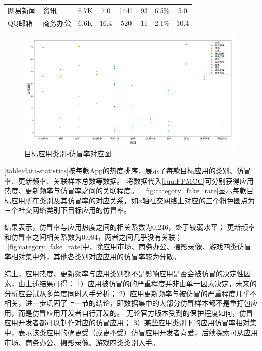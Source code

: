 \begin{ThreePartTable}
\begin{longtable}{l l c c c c c c}
        \rowcolor{gray!15} 网易新闻     & 资讯       & 6.7K                       & 7.0                        & 1441           & 93                         & 6.5\%        & 5.0                        \\
        QQ邮箱                          & 商务办公   & 6.6K                       & 16.4                       & 520            & 11                         & 2.1\%        & 10.4                       \\
        \bottomrule
    \end{longtable}
    \vspace{-4mm}
\end{ThreePartTable}

\begin{figure}[htbp]
    \centering
    \setlength{\belowcaptionskip}{-10pt}
    \includegraphics[width=\textwidth]{./Figures/edwin-category-fake-rate.png}
    \caption{目标应用类别-仿冒率对应图}
    \label{fig:category_fake_rate}
\end{figure}

\autoref{table:data-statistics}按每款App的热度排序，展示了每款目标应用的类别、仿冒率、更新频率、关联样本总数等数据。
将数据代入\autoref{equ:PPMCC}可分别获得应用热度、更新频率与仿冒率之间的关联程度。
~\autoref{fig:category_fake_rate}显示每款目标应用所在类别及其仿冒率的对应关系，如$x$轴社交网络上对应的三个粉色圆点为三个社交网络类别下目标应用的仿冒率。

结果表示，仿冒率与应用热度之间的相关系数为0.246，处于较弱水平；
更新频率和仿冒率之间相关系数为0.084，两者之间几乎没有关联；
~\autoref{fig:category_fake_rate}中，除应用市场、商务办公、摄影录像、游戏四类仿冒率相对集中外，其他各类别对应应用的仿冒率较为分散。

综上，应用热度、更新频率与应用类别都不是影响应用是否会被仿冒的决定性因素，由上述结果可得：
1）应用被仿冒的的严重程度并非由单一因素决定，未来的分析应尝试从多角度同时入手分析；
2）应用更新频率与被仿冒的严重程度几乎不相关，进一步巩固了上一节的结论，即数据集中的大部分仿冒样本都不是重打包应用，而是仿冒应用开发者自行开发的。
无论官方版本受到的保护程度如何，仿冒应用开发者都可以制作对应的仿冒应用；
3）某些应用类别下的应用仿冒率相对集中，表示该类应用的确更受（或更不受）仿冒应用开发者喜爱，后续探索可从应用市场、商务办公、摄影录像、游戏四类类别入手。


